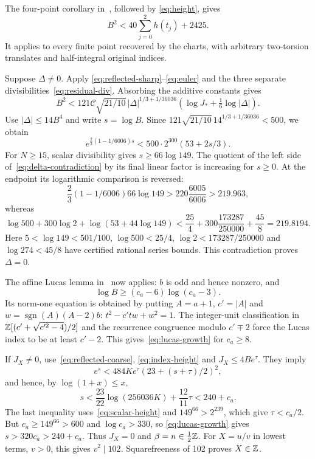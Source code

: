 \documentclass[11pt,a4paper]{article}
\begin{document}
The four-point corollary in~\cite{TorsionSums}, followed by
\eqref{eq:height}, gives
\begin{equation}\label{eq:index-height}
                    B^2<40\sum_{j=0}^2h(t_j)+2425.
\end{equation}
It applies to every finite point recovered by the charts, with
arbitrary two-torsion translates and half-integral original indices.

Suppose $\Delta\ne0$. Apply
\eqref{eq:reflected-sharp}--\eqref{eq:euler} and the three separate
divisibilities~\eqref{eq:residual-div}. Absorbing the additive
constants gives
\[
 B^2<121\mathcal C\sqrt{21/10}\,
 |\Delta|^{1/3+1/36036}
                  (\log J_*+\tfrac16\log|\Delta|).
\]
Use $|\Delta|\le14B^4$ and write $s=\log B$.
Since $121\sqrt{21/10}\,14^{1/3+1/36036}<500$, we obtain
\begin{equation}\label{eq:delta-contradiction}
 e^{\frac23(1-1/6006)s}
                   <500\cdot2^{300}(53+2s/3).
\end{equation}
For $N\ge15$, scalar divisibility gives $s\ge66\log149$.
The quotient of the left side of~\eqref{eq:delta-contradiction}
by its final linear factor is increasing for $s\ge0$.
At the endpoint its logarithmic comparison is reversed:
\[
 \frac23(1-1/6006)66\log149
       >220\frac{6005}{6006}>219.963,
\]
whereas
\[
 \log500+300\log2+\log(53+44\log149)
 <\frac{25}{4}+300\frac{173287}{250000}+\frac{45}{8}
 =219.8194.
\]
Here $5<\log149<501/100$, $\log500<25/4$,
$\log2<173287/250000$ and $\log274<45/8$ have certified
rational series bounds. This contradiction proves $\Delta=0$.

The affine Lucas lemma in~\cite{ExplicitParent} now applies:
$b$ is odd and hence nonzero, and
\begin{equation}\label{eq:lucas-growth}
                   \log B\ge(c_a-6)\log(c_a-3).
\end{equation}
Its norm-one equation is obtained by putting $A=a+1$, $c'=|A|$
and $w=\operatorname{sgn}(A)(A-2)b$:
$t^2-c'tw+w^2=1$.
The integer-unit classification in $\mathbb Z[(c'+\sqrt{c'^2-4})/2]$
and the recurrence congruence modulo $c'\mp2$ force the Lucas
index to be at least $c'-2$. This gives~\eqref{eq:lucas-growth}
for $c_a\ge8$.

If $J_X\ne0$, use~\eqref{eq:reflected-coarse},
\eqref{eq:index-height} and $J_X\le4Be^\tau$. They imply
\[
 e^s<484K e^\tau(23+(s+\tau)/2)^2,
\]
and hence, by $\log(1+x)\le x$,
\[
 s<\frac{23}{22}\log(256036K)+\frac{12}{11}\tau<240+c_a.
\]
The last inequality uses~\eqref{eq:scalar-height} and
$149^{66}>2^{239}$, which give $\tau<c_a/2$.
But $c_a\ge149^{66}>600$ and $\log c_a>330$, so
\eqref{eq:lucas-growth} gives $s>320c_a>240+c_a$.
Thus $J_X=0$ and $\beta=n\in\tfrac12\mathbb Z$.
For $X=u/v$ in lowest terms, $v>0$, this gives $v^2\mid102$.
Squarefreeness of 102 proves $X\in\mathbb Z$.
\end{document}
